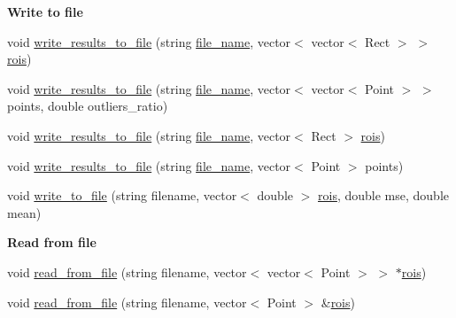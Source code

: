 \begin{Indent}{\bf Write to file}\par
\begin{DoxyCompactItemize}
\item 
void \hyperlink{classCvUtils_a78b9e8fc4f7ea2b713ab0bcca586600e}{write\-\_\-results\-\_\-to\-\_\-file} (string \hyperlink{rgbWriter_8cpp_a755d42f2e9c635ce2213e0efad62b796}{file\-\_\-name}, vector$<$ vector$<$ Rect $>$ $>$ \hyperlink{social__robot__onethread_8cpp_acb84e343c5602756e13a851a44128639}{rois})
\item 
void \hyperlink{classCvUtils_a61698b2aa9a5d770b7d4a6c77738bb2d}{write\-\_\-results\-\_\-to\-\_\-file} (string \hyperlink{rgbWriter_8cpp_a755d42f2e9c635ce2213e0efad62b796}{file\-\_\-name}, vector$<$ vector$<$ Point $>$ $>$ points, double outliers\-\_\-ratio)
\item 
void \hyperlink{classCvUtils_a0f3f68175623e99bc1669f3cd06fd301}{write\-\_\-results\-\_\-to\-\_\-file} (string \hyperlink{rgbWriter_8cpp_a755d42f2e9c635ce2213e0efad62b796}{file\-\_\-name}, vector$<$ Rect $>$ \hyperlink{social__robot__onethread_8cpp_acb84e343c5602756e13a851a44128639}{rois})
\item 
void \hyperlink{classCvUtils_a27e76804ac414cc7cdf2e34851dec86a}{write\-\_\-results\-\_\-to\-\_\-file} (string \hyperlink{rgbWriter_8cpp_a755d42f2e9c635ce2213e0efad62b796}{file\-\_\-name}, vector$<$ Point $>$ points)
\item 
void \hyperlink{classCvUtils_a417431598ac332bcce7a2d66add3662f}{write\-\_\-to\-\_\-file} (string filename, vector$<$ double $>$ \hyperlink{social__robot__onethread_8cpp_acb84e343c5602756e13a851a44128639}{rois}, double mse, double mean)
\end{DoxyCompactItemize}
\end{Indent}
\begin{Indent}{\bf Read from file}\par
\begin{DoxyCompactItemize}
\item 
void \hyperlink{classCvUtils_a9828a72b15006923f35d4da51359af2e}{read\-\_\-from\-\_\-file} (string filename, vector$<$ vector$<$ Point $>$ $>$ $\ast$\hyperlink{social__robot__onethread_8cpp_acb84e343c5602756e13a851a44128639}{rois})
\item 
void \hyperlink{classCvUtils_a5e7d37fa49e663f642718a1d6631ef41}{read\-\_\-from\-\_\-file} (string filename, vector$<$ Point $>$ \&\hyperlink{social__robot__onethread_8cpp_acb84e343c5602756e13a851a44128639}{rois})
\end{DoxyCompactItemize}
\end{Indent}
